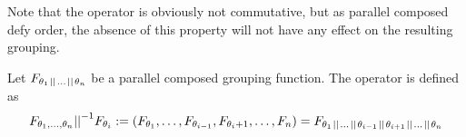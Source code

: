 \documentclass[preview]{standalone}
\begin{document}
%
%
%
Note that the operator \pll is obviously not commutative, but as parallel composed \grpfctsN defy order, the absence of this property will not have any effect on the resulting grouping.

\begin{definition}
	Let $\grpfct[\viewppty_1 \pll \dots \pll \viewppty_n]$ be a parallel composed grouping function. The operator \pllrev is defined as
	\[
	\grpfct[\viewppty_1, \dots, \viewppty_n] \pllrev \grpfct[\viewppty_i] := (\grpfct[\viewppty_1], \dots, \grpfct[\viewppty_{i-1}],\grpfct[\viewppty_i+1], \dots, \grpfct[n]) = \grpfct[\viewppty_1 \pll \dots \pll \viewppty_{i-1} \pll \viewppty_{i+1} \pll \dots \pll \viewppty_n]
	\]
\end{definition}
\end{document}
